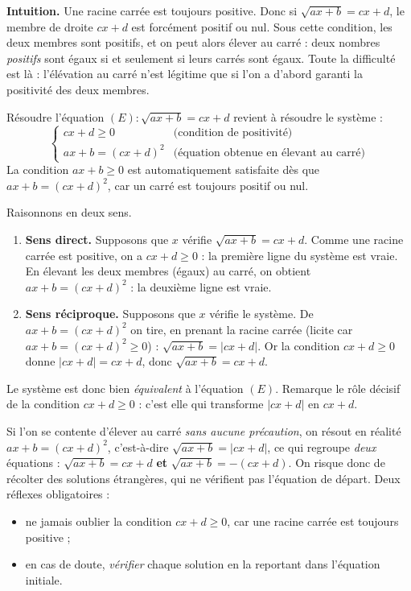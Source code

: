 \documentclass[11pt]{article}
\newcommand{\cle}[1]{{\popxbold\color{popdark}#1}}
\begin{document}
\textbf{Intuition.} Une racine carrée est toujours positive. Donc si $\sqrt{ax+b} = cx+d$, le membre de droite $cx+d$ est forcément positif ou nul. Sous cette condition, les deux membres sont positifs, et on peut alors élever au carré : deux nombres \emph{positifs} sont égaux si et seulement si leurs carrés sont égaux. Toute la difficulté est là : l'élévation au carré n'est légitime que si l'on a d'abord garanti la positivité des deux membres.

\begin{propriete}[Résolution de $\sqrt{ax+b} = cx+d$]
Résoudre l'équation $(E) : \sqrt{ax+b} = cx+d$ revient à résoudre le \cle{système} :
\[
\begin{cases}
cx + d \geq 0 & \text{(condition de positivité)} \\
ax + b = (cx+d)^2 & \text{(équation obtenue en élevant au carré)}
\end{cases}
\]
La condition $ax+b \geq 0$ est automatiquement satisfaite dès que $ax+b = (cx+d)^2$, car un carré est toujours positif ou nul.
\end{propriete}

\begin{experience}
Raisonnons en deux sens.
\begin{enumerate}
\item \textbf{Sens direct.} Supposons que $x$ vérifie $\sqrt{ax+b} = cx+d$. Comme une racine carrée est positive, on a $cx+d \geq 0$ : la première ligne du système est vraie. En élevant les deux membres (égaux) au carré, on obtient $ax+b = (cx+d)^2$ : la deuxième ligne est vraie.
\item \textbf{Sens réciproque.} Supposons que $x$ vérifie le système. De $ax+b = (cx+d)^2$ on tire, en prenant la racine carrée (licite car $ax+b = (cx+d)^2 \geq 0$) : $\sqrt{ax+b} = |cx+d|$. Or la condition $cx+d \geq 0$ donne $|cx+d| = cx+d$, donc $\sqrt{ax+b} = cx+d$.
\end{enumerate}
Le système est donc bien \emph{équivalent} à l'équation $(E)$. Remarque le rôle décisif de la condition $cx+d \geq 0$ : c'est elle qui transforme $|cx+d|$ en $cx+d$.
\end{experience}

\begin{attention}
Si l'on se contente d'élever au carré \emph{sans aucune précaution}, on résout en réalité $ax+b = (cx+d)^2$, c'est-à-dire $\sqrt{ax+b} = |cx+d|$, ce qui regroupe \emph{deux} équations : $\sqrt{ax+b} = cx+d$ \textbf{et} $\sqrt{ax+b} = -(cx+d)$. On risque donc de récolter des \cle{solutions étrangères}, qui ne vérifient pas l'équation de départ. Deux réflexes obligatoires :
\begin{itemize}
\item ne jamais oublier la condition $cx+d \geq 0$, car une racine carrée est toujours positive ;
\item en cas de doute, \emph{vérifier} chaque solution en la reportant dans l'équation initiale.
\end{itemize}
\end{attention}
\end{document}

